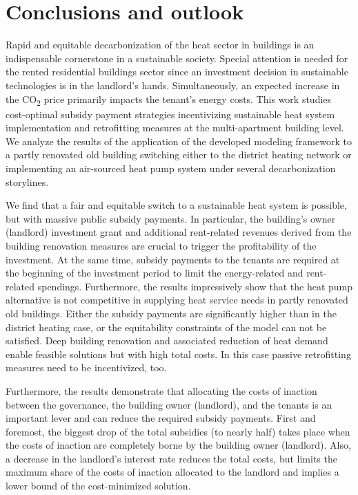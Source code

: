 \section{Conclusions and outlook}\label{conclusions}
Rapid and equitable decarbonization of the heat sector in buildings is an indispensable cornerstone in a sustainable society. Special attention is needed for the rented residential buildings sector since an investment decision in sustainable technologies is in the landlord's hands. Simultaneously, an expected increase in the CO\textsubscript{2} price primarily impacts the tenant's energy costs. This work studies cost-optimal subsidy payment strategies incentivizing sustainable heat system implementation and retrofitting measures at the multi-apartment building level. We analyze the results of the application of the developed modeling framework to a partly renovated old building switching either to the district heating network or implementing an air-sourced heat pump system under several decarbonization storylines.\vspace{0.5cm}

We find that a fair and equitable switch to a sustainable heat system is possible, but with massive public subsidy payments. In particular, the building's owner (landlord) investment grant and additional rent-related revenues derived from the building renovation measures are crucial to trigger the profitability of the investment. At the same time, subsidy payments to the tenants are required at the beginning of the investment period to limit the energy-related and rent-related spendings. Furthermore, the results impressively show that the heat pump alternative is not competitive in supplying heat service needs in partly renovated old buildings. Either the subsidy payments are significantly higher than in the district heating case, or the equitability constraints of the model can not be satisfied. Deep building renovation and associated reduction of heat demand enable feasible solutions but with high total costs. In this case passive retrofitting measures need to be incentivized, too.\vspace{0.5cm}

Furthermore, the results demonstrate that allocating the costs of inaction between the governance, the building owner (landlord), and the tenants is an important lever and can reduce the required subsidy payments. First and foremost, the biggest drop of the total subsidies (to nearly half) takes place when the costs of inaction are completely borne by the building owner (landlord). Also, a decrease in the landlord's interest rate reduces the total costs, but limits the maximum share of the costs of inaction allocated to the landlord and implies a lower bound of the cost-minimized solution.\vspace{0.5cm}

